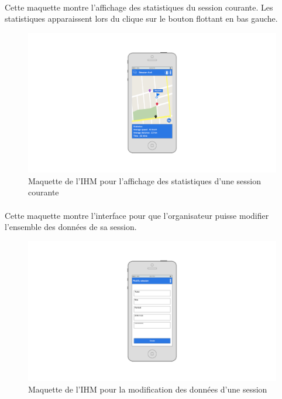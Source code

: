 \documentclass[titlepage, 12pt]{report}
\begin{document}
\paragraph{}Cette maquette montre l'affichage des statistiques du session courante. Les statistiques apparaissent lors du clique sur le bouton flottant en bas gauche.

\begin{figure}[!h]
	\caption{Maquette de l'IHM pour l'affichage des statistiques d'une session courante}
	\label{statistics_view}
	\centering
	\includegraphics[scale=0.2]{images/mockups/statistics.png}
\end{figure}

\paragraph{}Cette maquette montre l'interface pour que l'organisateur puisse modifier l'ensemble des données de sa session.

\begin{figure}[!h]
	\caption{Maquette de l'IHM pour la modification des données d'une session}
	\label{modify_session}
	\centering
	\includegraphics[scale=0.2]{images/mockups/modify_session.png}
\end{figure}
\end{document}
